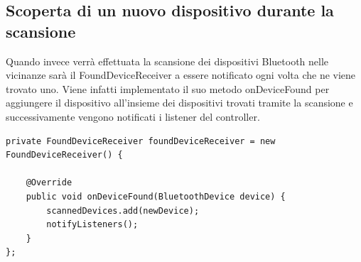 \subsection{Scoperta di un nuovo dispositivo durante la scansione}
Quando invece verrà effettuata la scansione dei dispositivi Bluetooth nelle vicinanze sarà il FoundDeviceReceiver a essere notificato ogni volta che ne viene trovato uno. Viene infatti implementato il suo metodo onDeviceFound per aggiungere il dispositivo all'insieme dei dispositivi trovati tramite la scansione e successivamente vengono notificati i listener del controller.
\begin{verbatim}
private FoundDeviceReceiver foundDeviceReceiver = new FoundDeviceReceiver() {

    @Override
    public void onDeviceFound(BluetoothDevice device) {
        scannedDevices.add(newDevice);
        notifyListeners();
    }
};
\end{verbatim}

